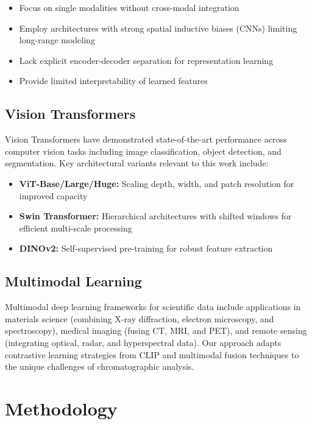 \documentclass[12pt,a4paper]{article}
\begin{document}
\begin{itemize}
    \item Focus on single modalities without cross-modal integration
    \item Employ architectures with strong spatial inductive biases (CNNs) limiting long-range modeling
    \item Lack explicit encoder-decoder separation for representation learning
    \item Provide limited interpretability of learned features
\end{itemize}

\subsection{Vision Transformers}

Vision Transformers \cite{dosovitskiy2021image} have demonstrated state-of-the-art performance across computer vision tasks including image classification, object detection, and segmentation. Key architectural variants relevant to this work include:

\begin{itemize}
    \item \textbf{ViT-Base/Large/Huge:} Scaling depth, width, and patch resolution for improved capacity
    \item \textbf{Swin Transformer:} Hierarchical architectures with shifted windows for efficient multi-scale processing
    \item \textbf{DINOv2:} Self-supervised pre-training for robust feature extraction
\end{itemize}

\subsection{Multimodal Learning}

Multimodal deep learning frameworks for scientific data include applications in materials science (combining X-ray diffraction, electron microscopy, and spectroscopy), medical imaging (fusing CT, MRI, and PET), and remote sensing (integrating optical, radar, and hyperspectral data). Our approach adapts contrastive learning strategies from CLIP \cite{radford2021learning} and multimodal fusion techniques to the unique challenges of chromatographic analysis.

\section{Methodology}
\end{document}

